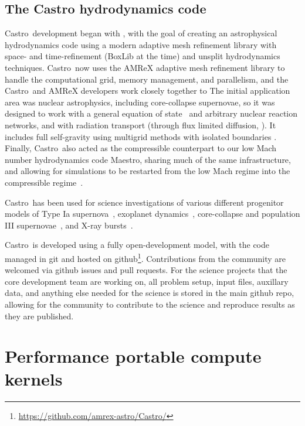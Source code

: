 \documentclass[twocolumn,times]{aastex62}
\newcommand{\castro}{{\sf Castro}}
\newcommand{\maestro}{{\sf Maestro}}
\begin{document}
\subsection{The Castro hydrodynamics code}

\castro\ development began with \cite{castro}, with the goal of
creating an astrophysical hydrodynamics code using a modern adaptive
mesh refinement library with space- and time-refinement (BoxLib at the
time) and unsplit hydrodynamics techniques.  \castro\ now uses the
AMReX adaptive mesh refinement library to handle the computational
grid, memory management, and parallelism, and the \castro\ and AMReX
developers work closely together to The initial application area was
nuclear astrophysics, including core-collapse supernovae, so it was
designed to work with a general equation of state~\citep{zingalekatz}
and arbitrary nuclear reaction networks, and with radiation transport
(through flux limited diffusion, \citealt{castro2,castro3}).  It
includes full self-gravity using multigrid methods with isolated
boundaries \citep{katz:2016}.  Finally, \castro\ also acted as the
compressible counterpart to our low Mach number hydrodynamics code
\maestro, sharing much of the same infrastructure, and allowing for
simulations to be restarted from the low Mach regime into the
compressible regime~\citep{malone:2014}.

\castro\ has been used for science investigations of various different
progenitor models of Type Ia
supernova~\citep{malone:2014,katz:2016,polin:2019}, exoplanet
dynamics~\citep{ryu:2018}, core-collapse and population III
supernovae~\citep{chen:2014,dolence:2015,chen:2017}, and X-ray
bursts~\citep{astronum:2018}.

\castro\ is developed using a fully open-development model, with the
code managed in git and hosted on
github\footnote{\url{https://github.com/amrex-astro/Castro/}}.
Contributions from the community are welcomed via github issues and
pull requests.  For the science projects that the core development
team are working on, all problem setup, input files, auxillary data,
and anything else needed for the science is stored in the main github
repo, allowing for the community to contribute to the science and
reproduce results as they are published.

\section{Performance portable compute kernels}
\end{document}
